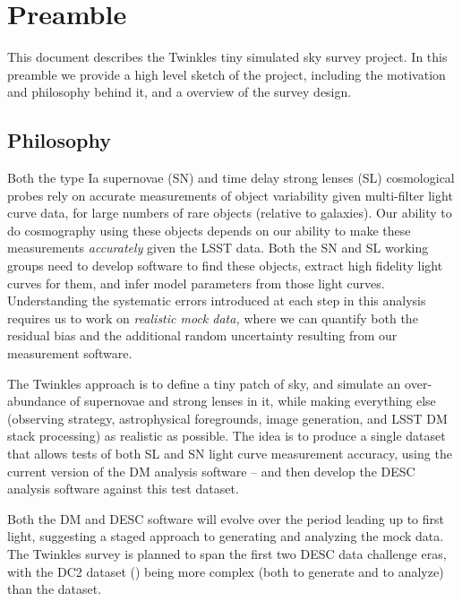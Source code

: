 \chapter*{Preamble}
\label{chp:preamble}

This document describes the Twinkles tiny simulated sky survey
project. In this preamble we  provide a high level sketch of the
project, including the motivation and philosophy behind it, and a
overview of the survey design.


\section{Philosophy}
\label{sec:preamble:philosophy}

Both the type Ia supernovae (SN) and time delay strong lenses (SL)
cosmological probes rely on accurate measurements of object
variability given multi-filter light curve data, for large numbers of
rare objects (relative to galaxies). Our ability to do cosmography
using these objects depends on our ability to make these measurements
{\it accurately} given the LSST data. Both the SN and SL working
groups need to develop software to find these objects, extract high
fidelity light curves for them, and infer model parameters from those
light curves. Understanding the systematic errors introduced at each
step in this analysis requires us to work on {\it realistic mock
data,} where we can quantify both the residual bias and the additional
random uncertainty resulting from our measurement software.

The Twinkles approach is to define a tiny patch of sky, and simulate
an over-abundance of supernovae and strong lenses in it, while making
everything else (observing strategy, astrophysical foregrounds, image
generation, and LSST DM stack processing) as realistic as possible.
The idea is to produce a single dataset that allows tests of both SL
and SN light curve measurement accuracy, using the current version of
the  DM analysis software -- and then develop the DESC analysis
software  against this test dataset.

Both the DM and DESC software will evolve over
the period leading up to first light, suggesting a staged approach to
generating and analyzing the mock data. The Twinkles survey is planned
to span the first two DESC data challenge eras, with the DC2 dataset (\TwinklesTwo) being
more complex (both to generate and to analyze) than the \TwinklesOne
dataset.

